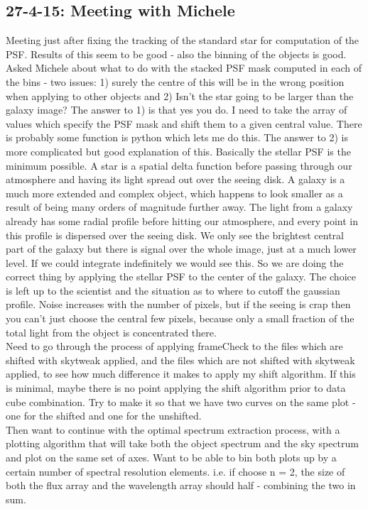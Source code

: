 \documentclass{literature}
\begin{document}
\subsection{27-4-15: Meeting with Michele}
Meeting just after fixing the tracking of the standard star for computation of the PSF. Results of this seem to be good - also the binning of the objects is good. Asked Michele about what to do with the stacked PSF mask computed in each of the bins - two issues: 1) surely the centre of this will be in the wrong position when applying to other objects and 2) Isn't the star going to be larger than the galaxy image? The answer to 1) is that yes you do. I need to take the array of values which specify the PSF mask and shift them to a given central value. There is probably some function is python which lets me do this. The answer to 2) is more complicated but good explanation of this. Basically the stellar PSF is the minimum possible. A star is a spatial delta function before passing through our atmosphere and having its light spread out over the seeing disk. A galaxy is a much more extended and complex object, which happens to look smaller as a result of being many orders of magnitude further away. The light from a galaxy already has some radial profile before hitting our atmosphere, and every point in this profile is dispersed over the seeing disk. We only see the brightest central part of the galaxy but there is signal over the whole image, just at a much lower level. If we could integrate indefinitely we would see this. So we are doing the correct thing by applying the stellar PSF to the center of the galaxy. The choice is left up to the scientist and the situation as to where to cutoff the gaussian profile. Noise increases with the number of pixels, but if the seeing is crap then you can't just choose the central few pixels, because only a small fraction of the total light from the object is concentrated there. \\ 
Need to go through the process of applying frameCheck to the files which are shifted with skytweak applied, and the files which are not shifted with skytweak applied, to see how much difference it makes to apply my shift algorithm. If this is minimal, maybe there is no point applying the shift algorithm prior to data cube combination. Try to make it so that we have two curves on the same plot - one for the shifted and one for the unshifted.   \\ 
Then want to continue with the optimal spectrum extraction process, with a plotting algorithm that will take both the object spectrum and the sky spectrum and plot on the same set of axes. Want to be able to bin both plots up by a certain number of spectral resolution elements. i.e. if choose n = 2, the size of both the flux array and the wavelength array should half - combining the two in sum. \\ 
\end{document}
